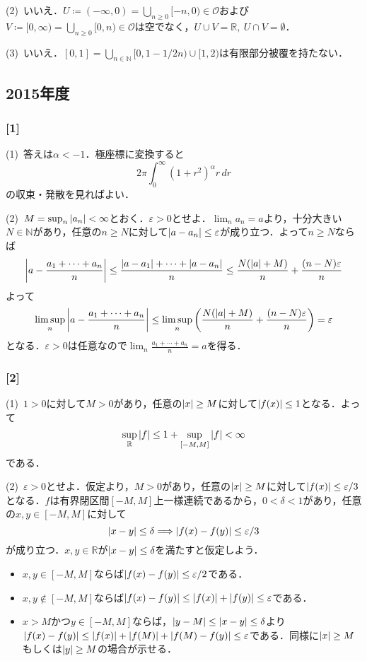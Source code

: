 \documentclass[a4j]{ltjsarticle}
\newcommand{\Rset}{\mathbb{R}}
\newcommand{\Nset}{\mathbb{N}}
\newcommand{\1}{\mathbbm{1}}
\numberwithin{equation}{section}
\theoremstyle{definition}
\begin{document}
(2)\ いいえ．$U\coloneq(-\infty,0)=\bigcup_{n\geq0}[-n,0)\in\mathcal{O}$および$V\coloneq [0,\infty)=\bigcup_{n\geq0}[0,n)\in\mathcal{O}$は空でなく，$U\cup V=\Rset,\ U\cap V=\emptyset$．

(3)\ いいえ．$[0,1]=\bigcup_{n\in\Nset}[0,1-1/2n)\cup [1,2)$は有限部分被覆を持たない．
\subsection{2015年度}
\subsubsection*{[1]}
(1)\ 答えは$\alpha<-1$．極座標に変換すると
\begin{equation}
    2\pi\int_0^\infty (1+r^2)^\alpha r\,dr 
\end{equation}
の収束・発散を見ればよい．

(2)\ $M=\sup_{n}\abs{a_n}<\infty$とおく．$\varepsilon>0$とせよ．$\lim_{n}a_n=a$より，十分大きい$N\in\Nset$があり，任意の$n\geq N$に対して$\abs{a-a_n}\leq \varepsilon$が成り立つ．よって$n\geq N$ならば
\begin{equation}
    \abs{a-\frac{a_1+\cdots+a_n}{n}}\leq \frac{\abs{a-a_1}+\cdots+\abs{a-a_n}}{n}\leq \frac{N(\abs{a}+M)}{n}+\frac{(n-N)\varepsilon}{n}
\end{equation}
よって
\begin{equation}
    \limsup_{n}\abs{a-\frac{a_1+\cdots+a_n}{n}}\leq \limsup_{n}\qty(\frac{N(\abs{a}+M)}{n}+\frac{(n-N)\varepsilon}{n})=\varepsilon
\end{equation}
となる．$\varepsilon>0$は任意なので$\lim_{n}\frac{a_1+\cdots+a_n}{n}=a$を得る．
\subsubsection*{[2]}
(1)\ $1>0$に対して$M>0$があり，任意の$\abs{x}\geq M$に対して$\abs{f(x)}\leq 1$となる．よって
\begin{equation}
    \sup_{\Rset}\abs{f}\leq 1+\sup_{[-M,M]}\abs{f}<\infty 
\end{equation}
である．

(2)\ $\varepsilon>0$とせよ．仮定より，$M>0$があり，任意の$\abs{x}\geq M$に対して$\abs{f(x)}\leq \varepsilon/3$となる．$f$は有界閉区間$[-M,M]$上一様連続であるから，$0<\delta<1$があり，任意の$x,y\in [-M,M]$に対して
\begin{equation}
    \abs{x-y}\leq \delta\Longrightarrow \abs{f(x)-f(y)}\leq \varepsilon/3 
\end{equation}
が成り立つ．$x,y\in\Rset$が$\abs{x-y}\leq \delta$を満たすと仮定しよう．
\begin{itemize}
    \item $x,y\in[-M,M]$ならば$\abs{f(x)-f(y)}\leq \varepsilon/2$である．
    \item $x,y\notin [-M,M]$ならば$\abs{f(x)-f(y)}\leq \abs{f(x)}+\abs{f(y)}\leq \varepsilon$である．
    \item $x>M$かつ$y\in [-M,M]$ならば，$\abs{y-M}\leq \abs{x-y}\leq \delta$より$\abs{f(x)-f(y)}\leq \abs{f(x)}+\abs{f(M)}+\abs{f(M)-f(y)}\leq \varepsilon$である．同様に$\abs{x}\geq M$もしくは$\abs{y}\geq M$の場合が示せる．
\end{itemize}
\end{document}
